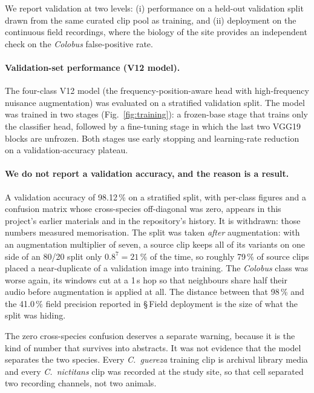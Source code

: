 \documentclass[review,3p,times]{elsarticle}
\begin{document}
We report validation at two levels: (i) performance on a held-out validation
split drawn from the same curated clip pool as training, and (ii) deployment on
the continuous field recordings, where the biology of the site provides an
independent check on the \textit{Colobus} false-positive rate.

\paragraph{Validation-set performance (V12 model).}
The four-class V12 model (the frequency-position-aware head with
high-frequency nuisance augmentation) was evaluated on a stratified
validation split. The model was trained in two stages
(Fig.~\ref{fig:training}): a frozen-base stage that trains only the
classifier head, followed by a fine-tuning stage in which the last two VGG19
blocks are unfrozen. Both stages use early stopping and learning-rate
reduction on a validation-accuracy plateau.

\paragraph{We do not report a validation accuracy, and the reason is a result.}
A validation accuracy of 98.12\,\% on a stratified split, with per-class
figures and a confusion matrix whose cross-species off-diagonal was zero,
appears in this project's earlier materials and in the repository's history. It
is withdrawn: those numbers measured memorisation. The split was taken \emph{after} augmentation: with an
augmentation multiplier of seven, a source clip keeps all of its variants on one
side of an 80/20 split only $0.8^{7} = 21\,\%$ of the time, so roughly 79\,\% of
source clips placed a near-duplicate of a validation image into training. The
\textit{Colobus} class was worse again, its windows cut at a 1\,s hop so that
neighbours share half their audio before augmentation is applied at all. The
distance between that 98\,\% and the 41.0\,\% field precision reported in
\S\,Field deployment is the size of what the split was hiding.

The zero cross-species confusion deserves a separate warning, because it is the
kind of number that survives into abstracts. It was not evidence that the model
separates the two species. Every \textit{C.\ guereza} training clip is archival
library media and every \textit{C.\ nictitans} clip was recorded at the study
site, so that cell separated two recording channels, not two animals.
\end{document}

